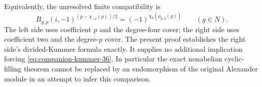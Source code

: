 Equivalently, the unresolved finite compatibility is
\begin{equation}
 B_{g,p}(i,-1)^{(p-\chi_{-4}(p))/2}
       =(-1)^{\chi_b(\rho_{p,2}(g))}
                   \qquad(g\in N).                       
\label{eq:companion-kummer-36}
\end{equation}
The left side uses coefficient \(p\) and the degree-four cover;
the right side uses coefficient two and the degree-\(p\) cover.
The present proof establishes the right side's divided-Kummer
formula exactly. It supplies no additional implication forcing
\eqref{eq:companion-kummer-36}. In particular the exact nonabelian cyclic-filling theorem
cannot be replaced by an endomorphism of the original Alexander
module in an attempt to infer this comparison.
